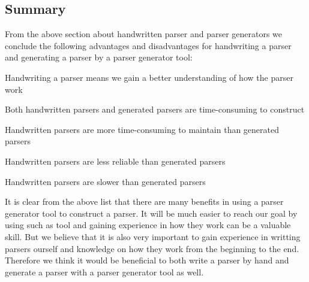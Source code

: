 \subsection{Summary}
\label{subsec:summary-parser}
From the above section about handwritten parser and parser generators we conclude the
following advantages and disadvantages for handwriting a parser and generating a parser by a parser
generator tool:

\begin{dlist}
\item Handwriting a parser means we gain a better understanding of how the parser work
\item Both handwritten parsers and generated parsers are time-consuming to construct
\item Handwritten parsers are more time-consuming to maintain than generated parsers
\item Handwritten parsers are less reliable than generated parsers
\item Handwritten parsers are slower than generated parsers
\end{dlist}

It is clear from the above list that there are many benefits in using a parser generator tool to
construct a parser. It will be much easier to reach our goal by using such as tool and gaining 
experience in how they work can be a valuable skill. But we believe that it is also very important 
to gain experience in writting parsers ourself and knowledge on how they work from the beginning to the end. 
Therefore we think it would be beneficial to both write a parser by hand and generate a parser with a parser 
generator tool as well.
